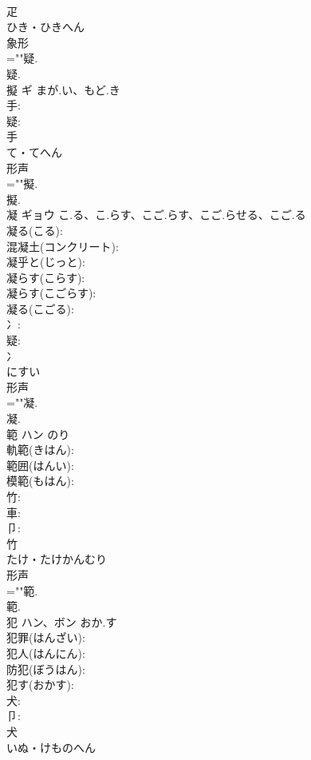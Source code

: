 \documentclass[8pt]{extreport}
\begin{document}
\begin{CJK}{UTF8}{min}
\\	疋	
\\	ひき・ひきへん	
\\	象形 
\\	=""疑.
\\	疑.
\\	擬	ギ	まが.い、もど.き		
\\	手: 
\\	疑: 
\\	手	
\\	て・てへん	
\\	形声 
\\	=""擬.
\\	擬.
\\	凝	ギョウ	こ.る、こ.らす、こご.らす、こご.らせる、こご.る		
\\	凝る(こる): 
\\	混凝土(コンクリート): 
\\	凝乎と(じっと): 
\\	凝らす(こらす): 
\\	凝らす(こごらす): 
\\	凝る(こごる): 
\\	冫: 
\\	疑: 
\\	冫	
\\	にすい	
\\	形声 
\\	=""凝.
\\	凝.
\\	範	ハン		のり	
\\	軌範(きはん): 
\\	範囲(はんい): 
\\	模範(もはん): 
\\	竹: 
\\	車: 
\\	卩: 
\\	竹	
\\	たけ・たけかんむり	
\\	形声 
\\	=""範.
\\	範.
\\	犯	ハン、ボン	おか.す		
\\	犯罪(はんざい): 
\\	犯人(はんにん): 
\\	防犯(ぼうはん): 
\\	犯す(おかす): 
\\	犬: 
\\	卩: 
\\	犬	
\\	いぬ・けものへん	

\end{CJK}
\end{document}
